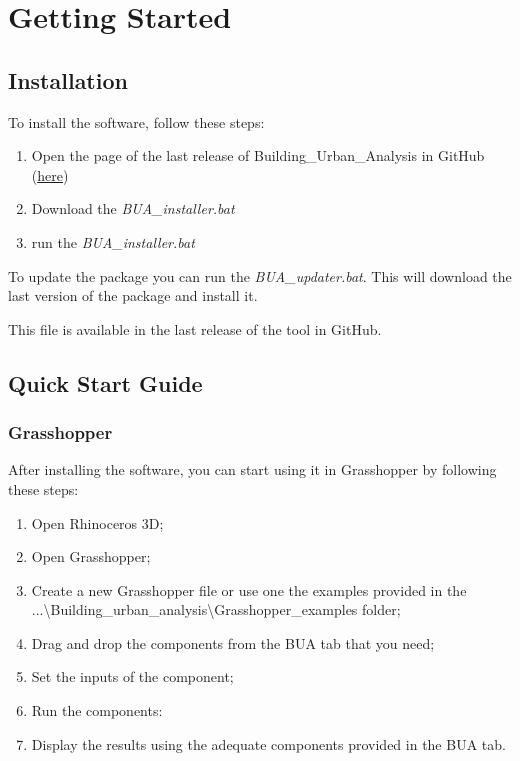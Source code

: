 \documentclass[a4paper,12pt]{article} %
\begin{document}
\section{Getting Started}
\label{sec:getting-started}

    \subsection{Installation}
    \label{subsec:installation}
    To install the software, follow these steps:
    \begin{enumerate}
        \item Open the page of the last release of Building\_Urban\_Analysis in GitHub (\href{https://github.com/Eliewiii/Building_Urban_Analysis}{here})
        \item Download the \textit{BUA\_installer.bat}
        \item run the \textit{BUA\_installer.bat}
    \end{enumerate}

    To update the package you can run the \textit{BUA\_updater.bat}.
    This will download the last version of the package and install it.

    This file is available in the last release of the tool in GitHub.

    \subsection{Quick Start Guide}
    \label{subsec:quick-start-guide}

    \subsubsection{Grasshopper}
    \label{subsubsec:quick-start-guide-grasshopper}
    After installing the software, you can start using it in Grasshopper by following these steps:
    \begin{enumerate}
        \item Open Rhinoceros 3D;
        \item Open Grasshopper;
        \item Create a new Grasshopper file or use one the examples provided in the ...\textbackslash Building\_urban\_analysis\textbackslash Grasshopper\_examples folder;
        \item Drag and drop the components from the BUA tab that you need;
        \item Set the inputs of the component;
        \item Run the components:
        \item Display the results using the adequate components provided in the BUA tab.
    \end{enumerate}
\end{document}
